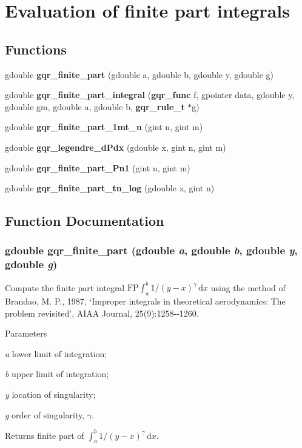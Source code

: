 \section{Evaluation of finite part integrals}
\label{group__finite}
\subsection*{Functions}
\begin{DoxyCompactItemize}
\item 
gdouble {\bf gqr\_\-finite\_\-part} (gdouble a, gdouble b, gdouble y, gdouble g)
\item 
gdouble {\bf gqr\_\-finite\_\-part\_\-integral} ({\bf gqr\_\-func} f, gpointer data, gdouble y, gdouble gm, gdouble a, gdouble b, {\bf gqr\_\-rule\_\-t} $\ast$g)
\item 
gdouble {\bf gqr\_\-finite\_\-part\_\-1mt\_\-n} (gint n, gint m)
\item 
gdouble {\bf gqr\_\-legendre\_\-dPdx} (gdouble x, gint n, gint m)
\item 
gdouble {\bf gqr\_\-finite\_\-part\_\-Pn1} (gint n, gint m)
\item 
gdouble {\bf gqr\_\-finite\_\-part\_\-tn\_\-log} (gdouble x, gint n)
\end{DoxyCompactItemize}


\subsection{Function Documentation}
\subsubsection[{gqr\_\-finite\_\-part}]{\setlength{\rightskip}{0pt plus 5cm}gdouble gqr\_\-finite\_\-part (gdouble {\em a}, \/  gdouble {\em b}, \/  gdouble {\em y}, \/  gdouble {\em g})}\label{group__finite_gad3b485753045033ddc1c8f73909aa6e3}
Compute the finite part integral $\mathrm{FP}\int_{a}^{b}1/(y-x)^{\gamma}\,\mathrm{d}x$ using the method of Brandao, M. P., 1987, `Improper integrals in theoretical aerodynamics: The problem revisited', AIAA Journal, 25(9):1258-\/-\/1260.


\begin{DoxyParams}{Parameters}
\item[{\em a}]lower limit of integration; \item[{\em b}]upper limit of integration; \item[{\em y}]location of singularity; \item[{\em g}]order of singularity, $\gamma$.\end{DoxyParams}
\begin{DoxyReturn}{Returns}
finite part of $\int_{a}^{b}1/(y-x)^{\gamma}\,\mathrm{d}x$. 
\end{DoxyReturn}
